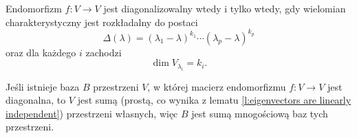 \begin{theorem}
    \label{t:endomorphism is diagonalizable iff polynomial...}
    Endomorfizm $f : V \to V$ jest diagonalizowalny wtedy i tylko wtedy, gdy wielomian charakterystyczny jest rozkładalny do postaci
    \[ \Delta(\lambda) = (\lambda_1 - \lambda)^{k_1}\cdots(\lambda_p - \lambda)^{k_p} \]
    oraz dla każdego $i$ zachodzi
    \[ \dim V_{\lambda_i} = k_i. \]
\end{theorem}

\begin{remark}
    \label{r:about base of diagonal matrix of endomorphism}
    Jeśli istnieje baza $B$ przestrzeni $V$, w której macierz endomorfizmu $f: V \to V$ jest diagonalna, to $V$ jest sumą (prostą, co wynika z lematu \ref{l:eigenvectors are linearly independent}) przestrzeni własnych, więc $B$ jest sumą mnogościową baz tych przestrzeni.
\end{remark}

